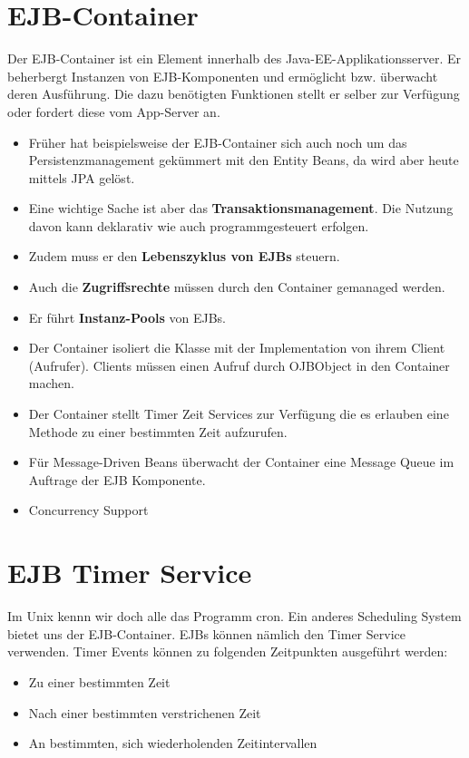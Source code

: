 \section{EJB-Container}
Der EJB-Container ist ein Element innerhalb des Java-EE-Applikationsserver. Er beherbergt Instanzen von EJB-Komponenten und ermöglicht bzw. überwacht deren Ausführung. Die dazu benötigten Funktionen stellt er selber zur Verfügung oder fordert diese vom App-Server an.

\begin{itemize}
	\item Früher hat beispielsweise der EJB-Container sich auch noch um das Persistenzmanagement gekümmert mit den Entity Beans, da wird aber heute mittels JPA gelöst.
	\item Eine wichtige Sache ist aber das \textbf{Transaktionsmanagement}.  Die Nutzung davon kann deklarativ wie auch programmgesteuert erfolgen.
	\item Zudem muss er den \textbf{Lebenszyklus von EJBs} steuern.
	\item Auch die \textbf{Zugriffsrechte} müssen durch den Container gemanaged werden.
	\item Er führt \textbf{Instanz-Pools} von EJBs.
	\item Der Container isoliert die Klasse mit der Implementation von ihrem Client (Aufrufer). Clients müssen einen Aufruf durch OJBObject in den Container machen.
	\item Der Container stellt Timer Zeit Services zur Verfügung die es erlauben eine Methode zu einer bestimmten Zeit aufzurufen.
	\item Für Message-Driven Beans überwacht der Container eine Message Queue im  Auftrage der EJB Komponente. 
	\item Concurrency Support 
\end{itemize}

\section{EJB Timer Service}
Im Unix kennn wir doch alle das Programm cron. Ein anderes Scheduling System bietet uns der EJB-Container. EJBs können nämlich den Timer Service verwenden. Timer Events können zu folgenden Zeitpunkten ausgeführt werden:
\begin{itemize}
\item Zu einer bestimmten Zeit 
\item Nach einer bestimmten verstrichenen Zeit 
\item An bestimmten, sich wiederholenden Zeitintervallen 
\end{itemize}	

